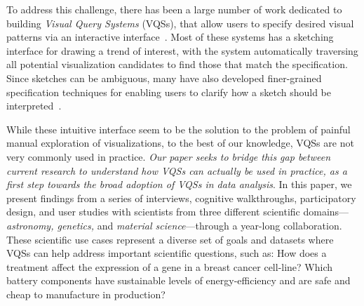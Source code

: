 \par To address this challenge, there has been a large number of work dedicated to building {\em Visual Query Systems} (VQSs), that allow users to specify desired visual patterns via an interactive interface~\cite{mohebbi2011google,Hochheiser2004,wattenberg2001sketching,Siddiqui2017VLDB,ryall2005querylines,correll2016semantics,Mannino2018,Eichmann2015,Holz2009}. Most of these systems has a sketching interface for drawing a trend of interest, with the system automatically traversing all potential visualization candidates to find those that match the specification. Since sketches can be ambiguous, many have also developed finer-grained specification techniques for enabling users to clarify how a sketch should be interpreted~\cite{ryall2005querylines,correll2016semantics,Mannino2018,Eichmann2015,Holz2009}. 
\par While these intuitive interface seem to be the solution to the problem of painful manual exploration of visualizations, to the best of our knowledge, VQSs are not very commonly used in practice. {\em Our paper seeks to bridge this gap between current research to understand how VQSs can actually be used in practice, as a first step towards the broad adoption of VQSs in data analysis}. In this paper, we present findings from a series of interviews, cognitive walkthroughs, participatory design, and user studies with scientists from three different scientific domains---{\em astronomy, genetics,} and {\em material science}---through a year-long collaboration. These scientific use cases represent a diverse set of goals and datasets where VQSs can help address important scientific questions, such as: How does a treatment affect the expression of a gene in a breast cancer cell-line? Which battery components have sustainable levels of energy-efficiency and are safe and cheap to manufacture in production?
